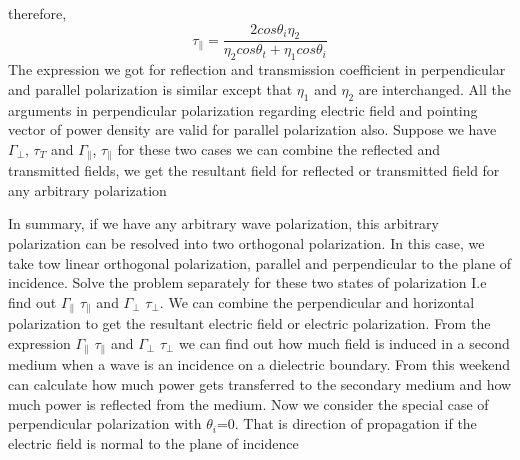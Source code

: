 therefore,
\begin{equation}
\tau_{\parallel} = \frac{2 cos\theta_{i} \eta_{2}}{\eta_{2} cos\theta_{t} + \eta_{1} cos\theta_{i}} 
\end{equation}
The expression we got for reflection and transmission coefficient in perpendicular and parallel polarization is similar except that $\eta_{1}$ and $\eta_{2}$ are interchanged. All the arguments in perpendicular polarization regarding electric field and pointing vector of power density are valid for parallel polarization also. Suppose we have $\Gamma_{\perp}$, $\tau_{T}$ and $\Gamma_{\parallel}$, $\tau_{\parallel}$ for these two cases we can combine the reflected and transmitted fields, we get the resultant field for reflected or transmitted field for any arbitrary  polarization 

In summary, if we have any arbitrary wave polarization, this arbitrary polarization can be resolved into two orthogonal polarization. In this case, we take tow linear orthogonal polarization, parallel and perpendicular to the plane of incidence. Solve the problem separately for these two states of polarization I.e find out $\Gamma_{\parallel}$  $\tau_{\parallel}$ and $\Gamma_{\bot}$ $\tau_{\perp}$. We can combine the perpendicular and horizontal polarization to get the resultant electric field or electric polarization. From the expression $\Gamma_{\parallel}$  $\tau_{\parallel}$ and $\Gamma_{\bot}$ $\tau_{\bot}$ we can find out how much field is induced in a second medium when a wave is an incidence on a dielectric boundary. From this weekend can calculate how much power gets transferred to the secondary medium and how much power is reflected from the medium. 
Now we consider the special case of perpendicular polarization with  $\theta_{i}$=0. That is direction of propagation if the electric  field is normal to the plane of incidence

